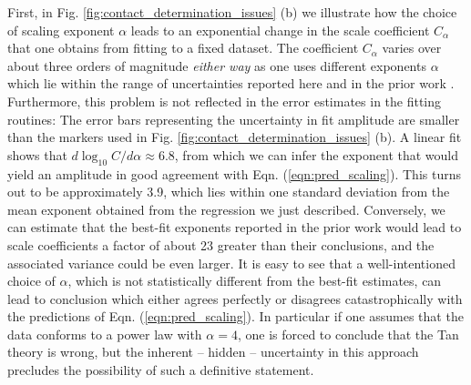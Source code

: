 	First, in Fig. \ref{fig:contact_determination_issues} (b) we illustrate how the choice of scaling exponent $\alpha$ leads to an exponential change in the scale coefficient $C_\alpha$ that one obtains from fitting to a fixed dataset.
	The coefficient $C_\alpha$ varies over about three orders of magnitude \emph{either way} as one uses different exponents $\alpha$ which lie within the range of uncertainties reported here and in the prior work \cite{Chang16}. 
	Furthermore, this problem is not reflected in the error estimates in the fitting routines: The error bars representing the uncertainty in fit amplitude are smaller than the markers used in Fig. \ref{fig:contact_determination_issues} (b). 
	A linear fit shows that $d \log_{10} C/d\alpha \approx 6.8$, from which we can infer the exponent that would yield an amplitude in good agreement with Eqn. (\ref{eqn:pred_scaling}). 
	This turns out to be approximately 3.9, which lies within one standard deviation from the mean exponent obtained from the regression we just described. 
	Conversely, we can estimate that the best-fit exponents reported in the prior work would lead to scale coefficients a factor of about 23 greater than their conclusions, and the associated variance could be even larger.
	It is easy to see that a well-intentioned choice of $\alpha$, which is not statistically different from the best-fit estimates, can lead to  conclusion which either agrees perfectly or disagrees catastrophically with the predictions of Eqn. (\ref{eqn:pred_scaling}).
	In particular if one assumes that the data conforms to a power law with $\alpha=4$, one is forced to conclude that the Tan theory is wrong, but the inherent -- hidden -- uncertainty in this approach precludes the possibility of such a definitive statement.


